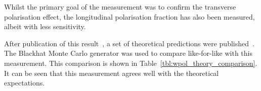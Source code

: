 Whilst the primary goal of the measurement was to confirm the transverse
polarisation effect, the longitudinal polarisation fraction has also been
measured, albeit with less sensitivity.

After publication of this result~\cite{cms_wpol_paper}, a set of theoretical
predictions were published~\cite{berger_left_handed_w}. The Blackhat Monte Carlo
generator was used to compare like-for-like with this measurement. This
comparison is shown in Table~\ref{tbl:wpol_theory_comparison}. It can be seen
that this measurement agrees well with the theoretical expectations.

